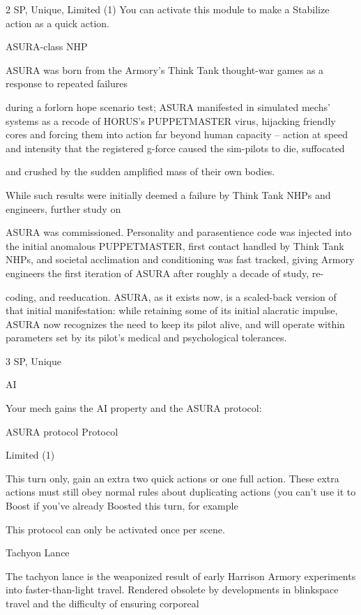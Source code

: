 2 SP, Unique, Limited (1)
You can activate this module to make a Stabilize action as a quick action.


ASURA-class NHP

ASURA was born from the Armory's Think Tank thought-war games as a response to repeated failures

during a forlorn hope scenario test; ASURA manifested in simulated mechs' systems as a recode of
HORUS's PUPPETMASTER virus, hijacking friendly cores and forcing them into action far beyond human
capacity -- action at speed and intensity that the registered g-force caused the sim-pilots to die, suffocated

and crushed by the sudden amplified mass of their own bodies.

While such results were initially deemed a failure by Think Tank NHPs and engineers, further study on

ASURA was commissioned. Personality and parasentience code was injected into the initial anomalous
PUPPETMASTER, first contact handled by Think Tank NHPs, and societal acclimation and conditioning
was fast tracked, giving Armory engineers the first iteration of ASURA after roughly a decade of study, re-

coding, and reeducation. ASURA, as it exists now, is a scaled-back version of that initial manifestation:
while retaining some of its initial alacratic impulse, ASURA now recognizes the need to keep its pilot alive,
and will operate within parameters set by its pilot's medical and psychological tolerances.

3 SP, Unique

AI

Your mech gains the AI property and the ASURA protocol:

         ASURA protocol
	        Protocol

         Limited (1)





         This turn only, gain an extra two quick actions or one full action. These extra actions must
         still obey normal rules about duplicating actions (you can’t use it to Boost if you’ve
         already Boosted this turn, for example

         This protocol can only be activated once per scene.


Tachyon Lance

The tachyon lance is the weaponized result of early Harrison Armory experiments into faster-than-light
travel. Rendered obsolete by developments in blinkspace travel and the difficulty of ensuring corporeal

